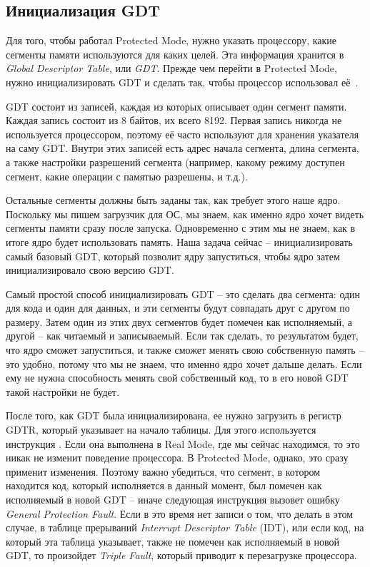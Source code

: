\documentclass[a4page]{article}
\begin{document}
\subsection{Инициализация GDT}

Для того, чтобы работал Protected Mode, нужно указать процессору, какие сегменты памяти используются для каких целей.
Эта информация хранится в \emph{Global Descriptor Table}, или \emph{GDT}.
Прежде чем перейти в Protected Mode, нужно инициализировать GDT и сделать так, чтобы процессор использовал её~\cite{osdev:gdttutorial}.

GDT состоит из записей, каждая из которых описывает один сегмент памяти.
Каждая запись состоит из 8 байтов, их всего 8192.
Первая запись никогда не используется процессором, поэтому её часто используют для хранения указателя на саму GDT.
Внутри этих записей есть адрес начала сегмента, длина сегмента, а также настройки разрешений сегмента 
(например, какому режиму доступен сегмент, какие операции с памятью разрешены, и т.д.).


Остальные сегменты должны быть заданы так, как требует этого наше ядро.
Поскольку мы пишем загрузчик для ОС, мы знаем, как именно ядро хочет видеть сегменты памяти сразу после запуска.
Одновременно с этим мы не знаем, как в итоге ядро будет использовать память.
Наша задача сейчас -- инициализировать самый базовый GDT, который позволит ядру запуститься,
чтобы ядро затем инициализировало свою версию GDT.

Самый простой способ инициализировать GDT -- это сделать два сегмента: один для кода и один для данных,
и эти сегменты будут совпадать друг с другом по размеру.
Затем один из этих двух сегментов будет помечен как исполняемый, а другой -- как читаемый и записываемый.
Если так сделать, то результатом будет, что ядро сможет запуститься, и также сможет менять свою собственную память --
это удобно, потому что мы не знаем, что именно ядро хочет дальше делать.
Если ему не нужна способность менять свой собственный код, то в его новой GDT такой настройки не будет.

После того, как GDT была инициализирована, ее нужно загрузить в регистр GDTR, который указывает на начало таблицы.
Для этого используется инструкция .
Если она выполнена в Real Mode, где мы сейчас находимся, то это никак не изменит поведение процессора.
В Protected Mode, однако, это сразу применит изменения.
Поэтому важно убедиться, что сегмент, в котором находится код, который исполняется в данный момент,
был помечен как исполняемый в новой GDT -- иначе следующая инструкция вызовет ошибку \emph{General Protection Fault}.
Если в это время нет записи о том, что делать в этом случае, в таблице прерываний \emph{Interrupt Descriptor Table} (IDT),
или если код, на который эта таблица указывает, также не помечен как исполняемый в новой GDT,
то произойдет \emph{Triple Fault}, который приводит к перезагрузке процессора.
\end{document}
